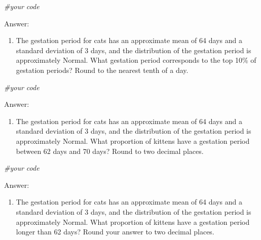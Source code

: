 \documentclass[
]{article}
\newenvironment{Shaded}{\begin{snugshade}}{\end{snugshade}}
\newcommand{\CommentTok}[1]{\textcolor[rgb]{0.56,0.35,0.01}{\textit{#1}}}
\providecommand{\tightlist}{%
  \setlength{\itemsep}{0pt}\setlength{\parskip}{0pt}}
\begin{document}
\begin{Shaded}
\begin{Highlighting}[]
\CommentTok{\#your code}
\end{Highlighting}
\end{Shaded}

Answer:

\begin{enumerate}
\def\labelenumi{\arabic{enumi}.}
\setcounter{enumi}{4}
\tightlist
\item
  The gestation period for cats has an approximate mean of 64 days and a
  standard deviation of 3 days, and the distribution of the gestation
  period is approximately Normal. What gestation period corresponds to
  the top 10\% of gestation periods? Round to the nearest tenth of a
  day.
\end{enumerate}

\begin{Shaded}
\begin{Highlighting}[]
\CommentTok{\#your code}
\end{Highlighting}
\end{Shaded}

Answer:

\begin{enumerate}
\def\labelenumi{\arabic{enumi}.}
\setcounter{enumi}{5}
\tightlist
\item
  The gestation period for cats has an approximate mean of 64 days and a
  standard deviation of 3 days, and the distribution of the gestation
  period is approximately Normal. What proportion of kittens have a
  gestation period between 62 days and 70 days? Round to two decimal
  places.
\end{enumerate}

\begin{Shaded}
\begin{Highlighting}[]
\CommentTok{\#your code}
\end{Highlighting}
\end{Shaded}

Answer:

\begin{enumerate}
\def\labelenumi{\arabic{enumi}.}
\setcounter{enumi}{6}
\tightlist
\item
  The gestation period for cats has an approximate mean of 64 days and a
  standard deviation of 3 days, and the distribution of the gestation
  period is approximately Normal. What proportion of kittens have a
  gestation period longer than 62 days? Round your answer to two decimal
  places.
\end{enumerate}
\end{document}
